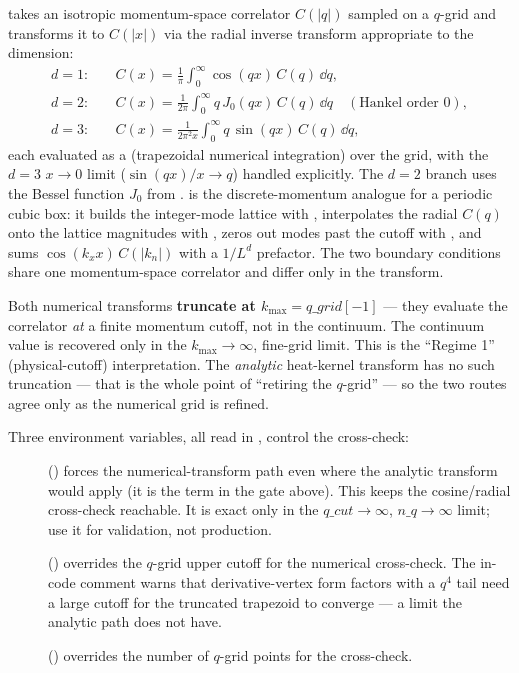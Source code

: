  takes an isotropic momentum-space correlator
$C(|q|)$ sampled on a $q$-grid and transforms it to $C(|x|)$ via the radial
inverse transform appropriate to the dimension:
\begin{align*}
  d=1:&\quad C(x) = \tfrac{1}{\pi}\int_0^{\infty}\cos(qx)\,C(q)\,\dd q,\\
  d=2:&\quad C(x) = \tfrac{1}{2\pi}\int_0^{\infty} q\,J_0(qx)\,C(q)\,\dd q
       \quad(\text{Hankel order }0),\\
  d=3:&\quad C(x) = \tfrac{1}{2\pi^{2}x}\int_0^{\infty} q\,\sin(qx)\,C(q)\,\dd q,
\end{align*}
each evaluated as a  (trapezoidal numerical integration) over the
grid, with the $d=3$ $x\to 0$ limit ($\sin(qx)/x\to q$) handled explicitly. The
$d=2$ branch uses the Bessel function $J_0$ from .
 is the discrete-momentum analogue for a periodic
cubic box: it builds the integer-mode lattice with ,
interpolates the radial $C(q)$ onto the lattice magnitudes with ,
zeros out modes past the cutoff with , and sums
$\cos(k_x x)\,C(|k_n|)$ with a $1/L^{d}$ prefactor. The two boundary conditions
share one momentum-space correlator and differ only in the transform.

\begin{gotcha}
Both numerical transforms \textbf{truncate at $k_{\max}=q\_grid[-1]$} --- they
evaluate the correlator \emph{at} a finite momentum cutoff, not in the
continuum. The continuum value is recovered only in the $k_{\max}\to\infty$,
fine-grid limit. This is the ``Regime 1'' (physical-cutoff) interpretation. The
\emph{analytic} heat-kernel transform has no such truncation --- that is the
whole point of ``retiring the $q$-grid'' --- so the two routes agree only as the
numerical grid is refined.
\end{gotcha}

Three environment variables, all read in , control the
cross-check:

\begin{description}
  \item[] ()
        forces the numerical-transform path even where the analytic transform
        would apply (it is the  term in the gate above).
        This keeps the cosine/radial cross-check reachable. It is exact only in
        the $q\_cut\to\infty$, $n\_q\to\infty$ limit; use it for validation, not
        production.
  \item[] () overrides the
        $q$-grid upper cutoff for the numerical cross-check. The in-code comment
        warns that derivative-vertex form factors with a $q^{4}$ tail need a
        large cutoff for the truncated trapezoid to converge --- a limit the
        analytic path does not have.
  \item[] () overrides the
        number of $q$-grid points for the cross-check.
\end{description}

